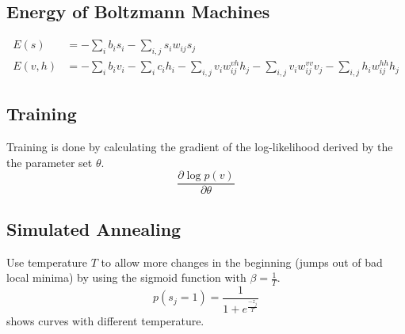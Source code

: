 


\subsection{Energy of Boltzmann Machines}
\begin{align}\label{eq:bm-energy}
E(s) &= - \sum_i b_i s_i - \sum_{i,j} s_i w_{ij} s_j\\
E(v,h) &= - \sum_i b_i v_i - \sum_i c_i h_i - \sum_{i,j} v_i w_{ij}^{vh} h_j - \sum_{i,j} v_i w_{ij}^{vv} v_j - \sum_{i,j} h_i w_{ij}^{hh} h_j
\end{align}

\subsection{Training}
Training is done by calculating the gradient of the log-likelihood derived by
the the parameter set $\theta$.
\begin{equation}
\frac{\partial \log p(v)}{\partial \theta}
\end{equation}


\subsection{Simulated Annealing}
Use temperature $T$ to allow more changes in the beginning (\eg jumps out of bad local minima) by using the sigmoid function with $\beta=\frac{1}{T}$.
\begin{equation}
p(s_j = 1) = \frac{1}{1 + e^{\frac{-z_j}{T}}}
\end{equation}
 shows curves with different temperature.

